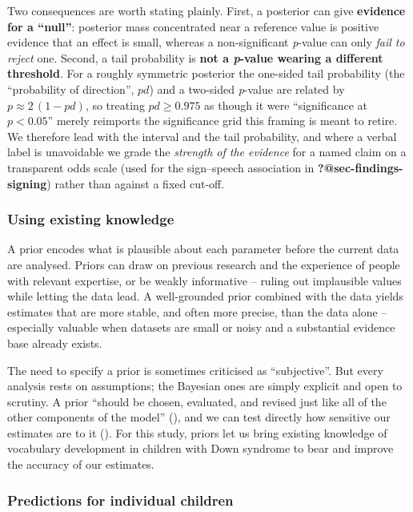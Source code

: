 \documentclass[
  11pt,
  a4paper,
]{report}
\begin{document}
Two consequences are worth stating plainly. First, a posterior can give
\textbf{evidence for a ``null''}: posterior mass concentrated near a
reference value is positive evidence that an effect is small, whereas a
non-significant \emph{p}-value can only \emph{fail to reject} one.
Second, a tail probability is \textbf{not a \emph{p}-value wearing a
different threshold}. For a roughly symmetric posterior the one-sided
tail probability (the ``probability of direction'', \(pd\)) and a
two-sided \emph{p}-value are related by \(p \approx 2\,(1 - pd)\), so
treating \(pd \ge 0.975\) as though it were ``significance at
\(p < 0.05\)'' merely reimports the significance grid this framing is
meant to retire. We therefore lead with the interval and the tail
probability, and where a verbal label is unavoidable we grade the
\emph{strength of the evidence} for a named claim on a transparent odds
scale (used for the sign--speech association in
\textbf{?@sec-findings-signing}) rather than against a fixed cut-off.

\subsubsection{Using existing knowledge}\label{using-existing-knowledge}

A prior encodes what is plausible about each parameter before the
current data are analysed. Priors can draw on previous research and the
experience of people with relevant expertise, or be weakly informative
-- ruling out implausible values while letting the data lead. A
well-grounded prior combined with the data yields estimates that are
more stable, and often more precise, than the data alone -- especially
valuable when datasets are small or noisy and a substantial evidence
base already exists.

The need to specify a prior is sometimes criticised as ``subjective''.
But every analysis rests on assumptions; the Bayesian ones are simply
explicit and open to scrutiny. A prior ``should be chosen, evaluated,
and revised just like all of the other components of the model''
(), and we can test directly how sensitive our estimates are to it
(). For this study, priors let us bring existing knowledge of
vocabulary development in children with Down syndrome to bear and
improve the accuracy of our estimates.

\subsubsection{Predictions for individual
children}\label{predictions-for-individual-children}
\end{document}
